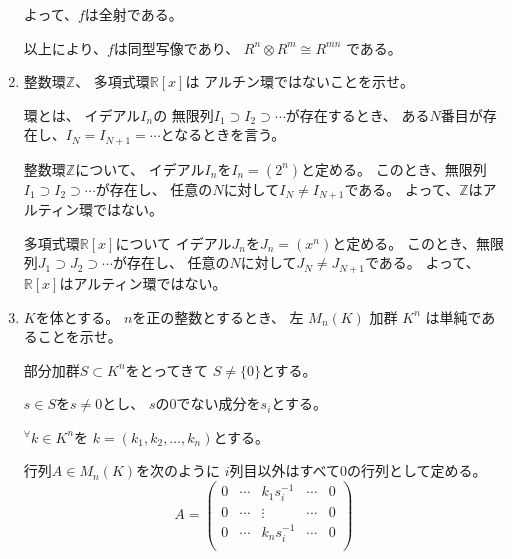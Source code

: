 \documentclass[12pt,b5paper]{ltjsarticle}
\begin{document}
\begin{enumerate}
      よって、$f$は全射である。


      以上により、$f$は同型写像であり、
      $R^{n}\otimes R^{m} \cong R^{mn}$
      である。


      \hrulefill

 \item
      整数環$\mathbb{Z}$、
      多項式環$\mathbb{R}[x]$は
      アルチン環ではないことを示せ。

      \dotfill

      環とは、
      イデアル$I_{n}$の
      無限列$I_{1}\supset I_{2} \supset \cdots $が存在するとき、
      ある$N$番目が存在し、$I_{N}=I_{N+1}=\cdots$となるときを言う。

      整数環$\mathbb{Z}$について、
      イデアル$I_{n}$を$I_{n} = (2^{n})$と定める。
      このとき、無限列$I_{1}\supset I_{2} \supset \cdots$が存在し、
      任意の$N$に対して$I_{N}\ne I_{N+1}$である。
      よって、$\mathbb{Z}$はアルティン環ではない。

      多項式環$\mathbb{R}[x]$について
      イデアル$J_{n}$を$J_{n} = (x^{n})$と定める。
      このとき、無限列$J_{1}\supset J_{2} \supset \cdots$が存在し、
      任意の$N$に対して$J_{N}\ne J_{N+1}$である。
      よって、$\mathbb{R}[x]$はアルティン環ではない。

      \hrulefill

 \item
      $K$を体とする。
      $n$を正の整数とするとき、
      左 $M_{n}(K)$ 加群 $K^{n}$ は単純であることを示せ。



      \dotfill

      部分加群$S\subset K^{n}$をとってきて
      $S\ne \{0\}$とする。

      $s\in S$を$s\ne 0$とし、
      $s$の0でない成分を$s_{i}$とする。

      ${}^{\forall}k\in K^{n}$を
      $k=(k_{1},k_{2},\dots,k_{n})$とする。

      行列$A\in M_{n}(K)$を次のように
      $i$列目以外はすべて0の行列として定める。
      \begin{equation}
       A=
        \begin{pmatrix}
         0 & \cdots & k_{1}s_{i}^{-1} & \cdots & 0\\
         0 & \cdots & \vdots & \cdots & 0\\
         0 & \cdots & k_{n}s_{i}^{-1} & \cdots & 0\\
        \end{pmatrix}
      \end{equation}


\end{enumerate}
\end{document}

